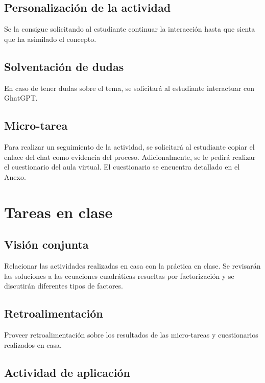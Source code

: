 \documentclass[a4,11pt]{aleph-notas}
\begin{document}
\subsection{Personalización de la actividad}

Se la consigue solicitando al estudiante continuar la interacción hasta que sienta que ha asimilado el concepto.

\subsection{Solventación de dudas}

En caso de tener dudas sobre el tema, se solicitará al estudiante interactuar con GhatGPT.

\subsection{Micro-tarea}

Para realizar un seguimiento de la actividad, se solicitará al estudiante copiar el enlace del chat como evidencia del proceso. Adicionalmente, se le pedirá realizar el cuestionario del aula virtual. El cuestionario se encuentra detallado en el Anexo.

\section{Tareas en clase}

\subsection{Visión conjunta}

Relacionar las actividades realizadas en casa con la práctica en clase. Se revisarán las soluciones a las ecuaciones cuadráticas resueltas por factorización y se discutirán diferentes tipos de factores.

\subsection{Retroalimentación}

Proveer retroalimentación sobre los resultados de las micro-tareas y cuestionarios realizados en casa.

\subsection{Actividad de aplicación}
\end{document}
